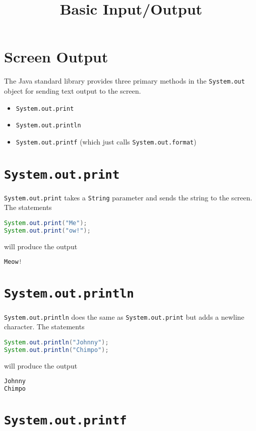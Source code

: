 \documentclass{article}
\title{Basic Input/Output}
\date{}
\begin{document}
\maketitle

\section{Screen Output}


The Java standard library provides three primary methods in the {\tt System.out} object for sending text output to the screen.

\begin{itemize}
\item {\tt System.out.print}
\item {\tt System.out.println}
\item {\tt System.out.printf} (which just calls {\tt System.out.format})
\end{itemize}


\section{{\tt System.out.print}}


{\tt System.out.print} takes a {\tt String} parameter and sends the string to the screen.  The statements
\begin{lstlisting}[language=Java]
System.out.print("Me");
System.out.print("ow!");
\end{lstlisting}
will produce the output
\begin{lstlisting}[language=Java]
Meow!
\end{lstlisting}


\section{{\tt System.out.println}}


{\tt System.out.println} does the same as {\tt System.out.print} but adds a newline character.  The statements
\begin{lstlisting}[language=Java]
System.out.println("Johnny");
System.out.println("Chimpo");
\end{lstlisting}
will produce the output
\begin{lstlisting}[language=Java]
Johnny
Chimpo
\end{lstlisting}


\section{{\tt System.out.printf}}
\end{document}
